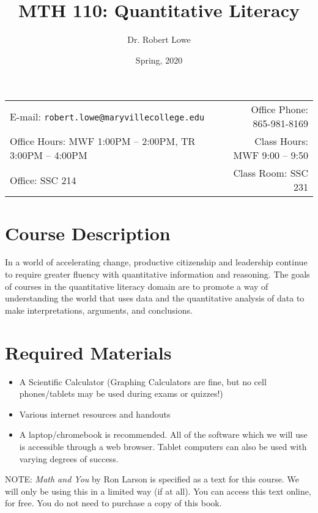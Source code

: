 \documentclass[11pt]{article}
\title{MTH 110: Quantitative Literacy}
\author{Dr. Robert Lowe}
\date{Spring, 2020}
\newcommand{\blankline}{\quad\pagebreak[2]}
\begin{document}
\maketitle

\blankline

\begin{tabular*}{.93\textwidth}{@{\extracolsep{\fill}}lr}


E-mail: \texttt{robert.lowe@maryvillecollege.edu} & Office Phone: 865-981-8169 \\

 Office Hours: MWF 1:00PM -- 2:00PM, TR 3:00PM -- 4:00PM  &  Class Hours: MWF 9:00 -- 9:50\\

 Office: SSC 214 & Class Room: SSC 231\\
\hline
\end{tabular*}

\vspace{5 mm}


\section*{Course Description}

In a world of accelerating change, productive citizenship and leadership continue to require greater
fluency with quantitative information and reasoning. The goals of courses in the quantitative literacy
domain are to promote a way of understanding the world that uses data and the quantitative analysis of
data to make interpretations, arguments, and conclusions.


\section*{Required Materials}

\begin{itemize}
\item A Scientific Calculator (Graphing Calculators are fine, but no cell phones/tablets may be used during exams or quizzes!)
\item Various internet resources and handouts
\item A laptop/chromebook is recommended.  All of the software which we will use is accessible through a web browser.  Tablet computers can also be used with varying degrees of success. 

\end{itemize}
NOTE: {\em Math and You} by Ron Larson is specified as a text for this course.  We will
only be using this in a limited way (if at all).  You can access this text online, for free. You do not need to purchase a copy of this book.
\end{document}
